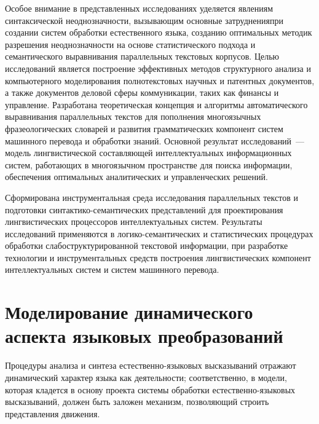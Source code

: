 \begin{multicols}{2}
  Особое внимание в пред\-став\-лен\-ных исследованиях
уделяется явлениям синтаксической неоднозначности, вызывающим 
основные затруднения\linebreak при создании систем обработки естественного языка, 
созданию оптимальных методик разрешения неоднозначности на основе 
статистического подхода и семантического выравнивания параллельных\linebreak 
текстовых корпусов. Целью исследований является построение эффективных 
методов структурного анализа и компьютерного моделирования 
полнотекстовых научных и патентных документов, а также документов 
деловой сферы коммуникации, таких как финансы и управление. Разработана 
теоретиче\-ская концепция и алгоритмы автоматического выравнивания 
параллельных текстов для пополнения многоязычных фразеологических 
словарей и развития грамматических компонент систем машинного перевода 
и обработки знаний. Основной результат исследований~--- модель 
лингвистической составляющей интеллектуальных информационных систем, 
работающих в многоязычном пространстве для поиска информации, 
обеспечения оптимальных аналитических и управленческих решений. 
  
  Сформирована инструментальная среда ис\-следования параллельных 
текстов и подготовки син\-так\-ти\-ко-се\-ман\-ти\-че\-ских представлений 
для проектирования лингвистических процессоров интеллекту\-альных 
  сис\-тем. Результаты исследований применяются в 
  ло\-ги\-ко-се\-ман\-ти\-че\-ских и статистических процедурах обработки 
слабоструктурированной текстовой информации, при разработке технологии 
и инструментальных средств построения лингвистических компонент 
интеллектуальных сис\-тем и сис\-тем машинного перевода. 

\vspace*{-6pt}
     
\section{Моделирование динамического аспекта языковых 
преобразований}

\vspace*{-3pt}
  
  Процедуры анализа и синтеза естественно-язы\-ко\-вых высказываний 
отражают динамический характер языка как деятельности; соответственно, в 
модели, которая кладется в основу проекта системы обработки естест\-вен\-но-язы\-ко\-вых 
высказываний, должен быть заложен механизм, позволяющий 
строить представления движения. 
  

\end{multicols}
